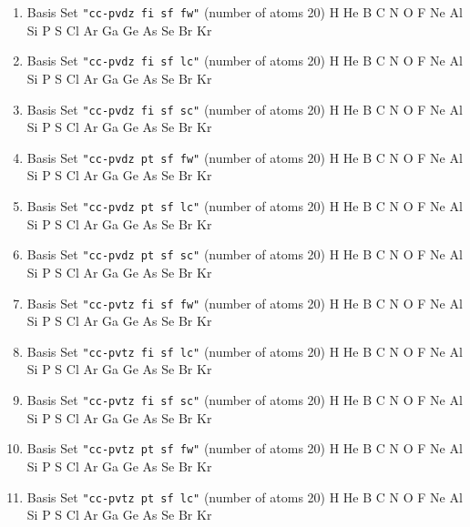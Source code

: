 \begin{enumerate}

\item Basis Set \verb#"cc-pvdz fi sf fw"# (number of atoms 20)  \newline 
  H He B C N O F Ne Al Si P S Cl Ar Ga Ge As Se Br Kr


\item Basis Set \verb#"cc-pvdz fi sf lc"# (number of atoms 20)  \newline 
  H He B C N O F Ne Al Si P S Cl Ar Ga Ge As Se Br Kr


\item Basis Set \verb#"cc-pvdz fi sf sc"# (number of atoms 20)  \newline 
  H He B C N O F Ne Al Si P S Cl Ar Ga Ge As Se Br Kr


\item Basis Set \verb#"cc-pvdz pt sf fw"# (number of atoms 20)  \newline 
  H He B C N O F Ne Al Si P S Cl Ar Ga Ge As Se Br Kr


\item Basis Set \verb#"cc-pvdz pt sf lc"# (number of atoms 20)  \newline 
  H He B C N O F Ne Al Si P S Cl Ar Ga Ge As Se Br Kr


\item Basis Set \verb#"cc-pvdz pt sf sc"# (number of atoms 20)  \newline 
  H He B C N O F Ne Al Si P S Cl Ar Ga Ge As Se Br Kr


\item Basis Set \verb#"cc-pvtz fi sf fw"# (number of atoms 20)  \newline 
  H He B C N O F Ne Al Si P S Cl Ar Ga Ge As Se Br Kr


\item Basis Set \verb#"cc-pvtz fi sf lc"# (number of atoms 20)  \newline 
  H He B C N O F Ne Al Si P S Cl Ar Ga Ge As Se Br Kr


\item Basis Set \verb#"cc-pvtz fi sf sc"# (number of atoms 20)  \newline 
  H He B C N O F Ne Al Si P S Cl Ar Ga Ge As Se Br Kr


\item Basis Set \verb#"cc-pvtz pt sf fw"# (number of atoms 20)  \newline 
  H He B C N O F Ne Al Si P S Cl Ar Ga Ge As Se Br Kr


\item Basis Set \verb#"cc-pvtz pt sf lc"# (number of atoms 20)  \newline 
  H He B C N O F Ne Al Si P S Cl Ar Ga Ge As Se Br Kr



\end{enumerate}
